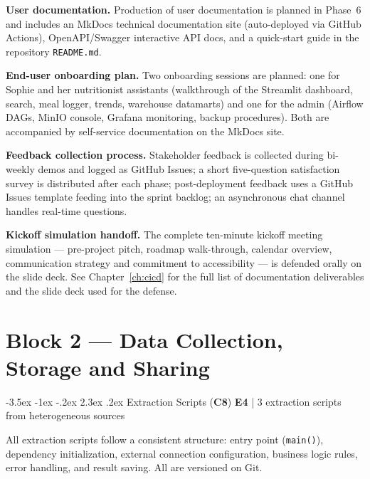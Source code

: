 \documentclass[a4paper,11pt,oneside,openany]{report}
\makeatletter
\renewcommand\section{\@startsection{section}{1}{\z@}%
  {-3.5ex \@plus -1ex \@minus -.2ex}%
  {2.3ex \@plus.2ex}%
  {\normalfont\Large\bfseries\color{ntgreen}}}
\newcommand{\competence}[1]{\textbf{\textcolor{ntgreen}{#1}}}
\newcommand{\evaluation}[1]{\textbf{\textcolor{ntblue}{#1}}}
\makeatother
\begin{document}
\textbf{User documentation.} Production of user documentation is
planned in Phase~6 and includes an MkDocs technical documentation
site (auto-deployed via GitHub Actions), OpenAPI/Swagger
interactive API docs, and a quick-start guide in the repository
\texttt{README.md}.

\textbf{End-user onboarding plan.} Two onboarding sessions are
planned: one for Sophie and her nutritionist assistants
(walkthrough of the Streamlit dashboard, search, meal logger,
trends, warehouse datamarts) and one for the admin (Airflow DAGs,
MinIO console, Grafana monitoring, backup procedures). Both are
accompanied by self-service documentation on the MkDocs site.

\textbf{Feedback collection process.} Stakeholder feedback is
collected during bi-weekly demos and logged as GitHub Issues; a
short five-question satisfaction survey is distributed after each
phase; post-deployment feedback uses a GitHub Issues template
feeding into the sprint backlog; an asynchronous chat channel
handles real-time questions.

\textbf{Kickoff simulation handoff.} The complete ten-minute
kickoff meeting simulation --- pre-project pitch, roadmap
walk-through, calendar overview, communication strategy and
commitment to accessibility --- is defended orally on the slide
deck. See Chapter~\ref{ch:cicd} for the full list of
documentation deliverables and the slide deck used for the
defense.


\chapter{Block 2 --- Data Collection, Storage and Sharing}
\label{ch:bloc2}

\section{Extraction Scripts (\competence{C8})}
\label{sec:c8}
{\small\evaluation{E4} | 3 extraction scripts from heterogeneous sources}

All extraction scripts follow a consistent structure: entry point
(\texttt{main()}), dependency initialization, external connection
configuration, business logic rules, error handling, and result saving.
All are versioned on Git.
\end{document}
